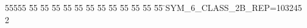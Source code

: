 %
%
\begin{tabbing}
55555 \= 55 \= 55 \= 55 \= 55 \= 55 \= 55 \= 55 \= 55 \= 55 \= 55 \= 55 \= 55 \= \>SYM\_6\_CLASS\_2B\_REP=103245\\[0pt]
2\>\end{tabbing}

